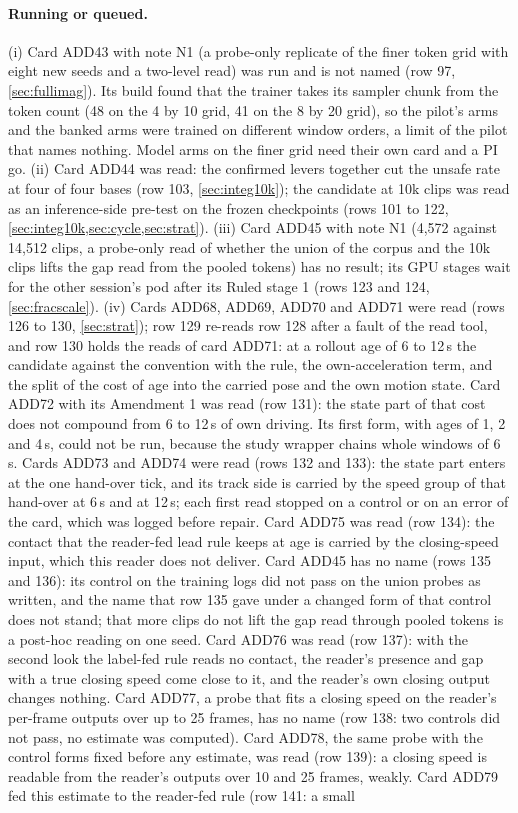 \paragraph{Running or queued.} (i) Card ADD43 with note N1 (a probe-only replicate of the finer token grid with eight new seeds and a two-level read) was run and is not named (row 97, \cref{sec:fullimag}). Its build found that the trainer takes its sampler chunk from the token count (48 on the 4 by 10 grid, 41 on the 8 by 20 grid), so the pilot's arms and the banked arms were trained on different window orders, a limit of the pilot that names nothing. Model arms on the finer grid need their own card and a PI go. (ii) Card ADD44 was read: the confirmed levers together cut the unsafe rate at four of four bases (row 103, \cref{sec:integ10k}); the candidate at 10k clips was read as an inference-side pre-test on the frozen checkpoints (rows 101 to 122, \cref{sec:integ10k,sec:cycle,sec:strat}). (iii) Card ADD45 with note N1 (4,572 against 14,512 clips, a probe-only read of whether the union of the corpus and the 10k clips lifts the gap read from the pooled tokens) has no result; its GPU stages wait for the other session's pod after its Ruled stage 1 (rows 123 and 124, \cref{sec:fracscale}). (iv) Cards ADD68, ADD69, ADD70 and ADD71 were read (rows 126 to 130, \cref{sec:strat}); row 129 re-reads row 128 after a fault of the read tool, and row 130 holds the reads of card ADD71: at a rollout age of 6 to 12\,s the candidate against the convention with the rule, the own-acceleration term, and the split of the cost of age into the carried pose and the own motion state. Card ADD72 with its Amendment 1 was read (row 131): the state part of that cost does not compound from 6 to 12\,s of own driving. Its first form, with ages of 1, 2 and 4\,s, could not be run, because the study wrapper chains whole windows of 6\,s. Cards ADD73 and ADD74 were read (rows 132 and 133): the state part enters at the one hand-over tick, and its track side is carried by the speed group of that hand-over at 6\,s and at 12\,s; each first read stopped on a control or on an error of the card, which was logged before repair. Card ADD75 was read (row 134): the contact that the reader-fed lead rule keeps at age is carried by the closing-speed input, which this reader does not deliver. Card ADD45 has no name (rows 135 and 136): its control on the training logs did not pass on the union probes as written, and the name that row 135 gave under a changed form of that control does not stand; that more clips do not lift the gap read through pooled tokens is a post-hoc reading on one seed. Card ADD76 was read (row 137): with the second look the label-fed rule reads no contact, the reader's presence and gap with a true closing speed come close to it, and the reader's own closing output changes nothing. Card ADD77, a probe that fits a closing speed on the reader's per-frame outputs over up to 25 frames, has no name (row 138: two controls did not pass, no estimate was computed). Card ADD78, the same probe with the control forms fixed before any estimate, was read (row 139): a closing speed is readable from the reader's outputs over 10 and 25 frames, weakly. Card ADD79 fed this estimate to the reader-fed rule (row 141: a small 